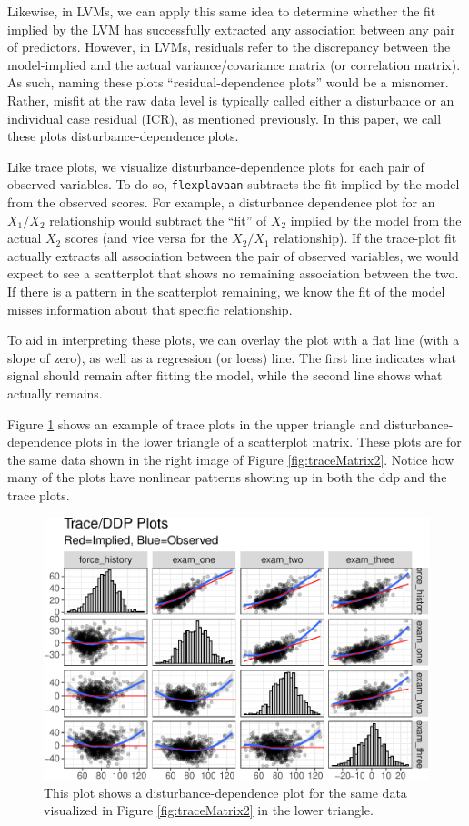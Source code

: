 \documentclass[
  english,
  doc]{apa6}
\begin{document}
Likewise, in LVMs, we can apply this same idea to determine whether the fit implied by the LVM has successfully extracted any association between any pair of predictors. However, in LVMs, residuals refer to the discrepancy between the model-implied and the actual variance/covariance matrix (or correlation matrix). As such, naming these plots ``residual-dependence plots'' would be a misnomer. Rather, misfit at the raw data level is typically called either a disturbance or an individual case residual (ICR), as mentioned previously. In this paper, we call these plots disturbance-dependence plots.

Like trace plots, we visualize disturbance-dependence plots for each pair of observed variables. To do so, \texttt{flexplavaan} subtracts the fit implied by the model from the observed scores. For example, a disturbance dependence plot for an \(X_1/X_2\) relationship would subtract the ``fit'' of \(X_2\) implied by the model from the actual \(X_2\) scores (and vice versa for the \(X_2/X_1\) relationship). If the trace-plot fit actually extracts all association between the pair of observed variables, we would expect to see a scatterplot that shows no remaining association between the two. If there is a pattern in the scatterplot remaining, we know the fit of the model misses information about that specific relationship.

To aid in interpreting these plots, we can overlay the plot with a flat line (with a slope of zero), as well as a regression (or loess) line. The first line indicates what signal should remain after fitting the model, while the second line shows what actually remains.

Figure \ref{fig:ddp} shows an example of trace plots in the upper triangle and disturbance-dependence plots in the lower triangle of a scatterplot matrix. These plots are for the same data shown in the right image of Figure \ref{fig:traceMatrix2}. Notice how many of the plots have nonlinear patterns showing up in both the ddp and the trace plots.



\begin{figure}
\centering
\includegraphics{flexplavaan_draft_files/figure-latex/ddp-1.pdf}
\caption{\label{fig:ddp}This plot shows a disturbance-dependence plot for the same data visualized in Figure \ref{fig:traceMatrix2} in the lower triangle.}
\end{figure}
\end{document}
